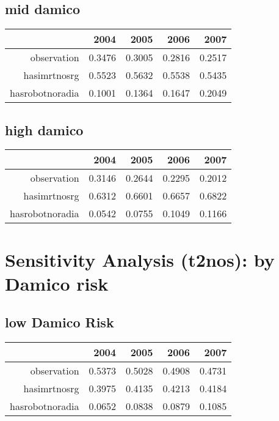 \documentclass[12pt]{report}
\begin{document}
\subsection{mid damico}
\begin{table}[ht]
\begin{center}
\begin{tabular}{rrrrr}
  \hline
 & 2004 & 2005 & 2006 & 2007 \\ 
  \hline
observation & 0.3476 & 0.3005 & 0.2816 & 0.2517 \\ 
  hasimrtnosrg & 0.5523 & 0.5632 & 0.5538 & 0.5435 \\ 
  hasrobotnoradia & 0.1001 & 0.1364 & 0.1647 & 0.2049 \\ 
   \hline
\end{tabular}
\end{center}
\end{table}
\subsection{high damico}
\begin{table}[ht]
\begin{center}
\begin{tabular}{rrrrr}
  \hline
 & 2004 & 2005 & 2006 & 2007 \\ 
  \hline
observation & 0.3146 & 0.2644 & 0.2295 & 0.2012 \\ 
  hasimrtnosrg & 0.6312 & 0.6601 & 0.6657 & 0.6822 \\ 
  hasrobotnoradia & 0.0542 & 0.0755 & 0.1049 & 0.1166 \\ 
   \hline
\end{tabular}
\end{center}
\end{table}

\pagebreak
\section{Sensitivity Analysis (t2nos):  by Damico risk}
\subsection{low Damico Risk}
\begin{table}[ht]
\begin{center}
\begin{tabular}{rrrrr}
  \hline
 & 2004 & 2005 & 2006 & 2007 \\ 
  \hline
observation & 0.5373 & 0.5028 & 0.4908 & 0.4731 \\ 
  hasimrtnosrg & 0.3975 & 0.4135 & 0.4213 & 0.4184 \\ 
  hasrobotnoradia & 0.0652 & 0.0838 & 0.0879 & 0.1085 \\ 
   \hline
\end{tabular}
\end{center}
\end{table}
\end{document}
